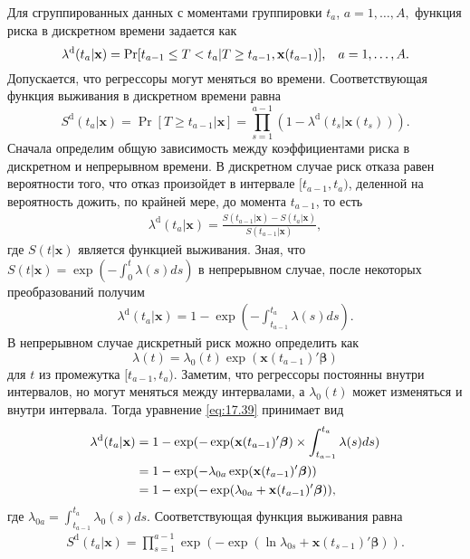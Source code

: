 \noindent
Для сгруппированных данных с моментами группировки $t_a$, $a=1, \ldots ,A,$ функция риска в дискретном времени задается как
        $$\lambda^{\mathrm{d}}(t_a|\mathbf{x})=\Pr[t_{a-1}\le T<t_a|T\ge t_{a-1},\mathbf{x}(t_{a-1})], \hspace{0.3cm} a=1, \ldots ,A.$$
Допускается, что регрессоры могут меняться во времени. Соответствующая функция выживания в дискретном времени равна
        $$S^{\mathrm{d}}(t_a|\mathbf{x})=\Pr[T\ge t_{a-1}|\mathbf{x}]=\prod^{a-1}_{s=1}\left(1-\lambda^{\mathrm{d}}(t_s|\mathbf{x}(t_s))\right).$$
Сначала определим общую зависимость между коэффициентами риска в дискретном и непрерывном времени. В дискретном случае риск отказа равен вероятности того, что отказ произойдет в интервале $[t_{a-1},t_a)$, деленной на вероятность дожить, по крайней мере, до момента $t_{a-1}$, то есть
        \begin{align}
        \label{eq:17.38}
        \lambda^{\mathrm{d}}(t_a|\mathbf{x})=\frac{S(t_{a-1}|\mathbf{x})-S(t_{a}|\mathbf{x})}{S(t_{a-1}|\mathbf{x})},
        \end{align}
где $S(t|\mathbf{x})$ является функцией выживания. Зная, что $S(t|\mathbf{x}) = \exp(-\int^{t}_{0}\lambda(s)ds)$ в непрерывном случае, после некоторых преобразований получим
        \begin{align}
        \label{eq:17.39}
        \lambda^{\mathrm{d}}(t_a|\mathbf{x})=1-\exp(-\int^{t_a}_{t_{a-1}}\lambda(s)ds).
        \end{align}
В непрерывном случае дискретный риск можно определить как
        $$\lambda(t)=\lambda_0(t)\exp(\mathbf{x}(t_{a-1})'\bm{\beta})$$
для $t$ из промежутка $[t_{a-1},t_a)$. Заметим, что регрессоры постоянны внутри интервалов, но могут меняться между интервалами, а $\lambda_0(t)$ может изменяться и внутри интервала. Тогда уравнение \ref{eq:17.39} принимает вид
        \begin{align}
        \label{eq:17.40}
        \lambda^{\mathrm{d}}(t_a|\mathbf{x})&=1-\exp(-\exp(\mathbf{x}(t_{a-1})'\bm{\beta})\times\int^{t_a}_{t_{a-1}}\lambda(s)ds)\\
        &=1-\exp(-\lambda_{0a}\exp(\mathbf{x}(t_{a-1})'\bm{\beta}))\notag\\
        &=1-\exp(-\exp(\lambda_{0a}+\mathbf{x}(t_{a-1})'\bm{\beta})),\notag
        \end{align}
где $\lambda_{0a}=\int^{t_a}_{t_{a-1}}\lambda_{0}(s)ds$. Соответствующая функция выживания равна
        \begin{align}
        \label{eq:17.41}
        S^{\mathrm{d}}(t_a|\mathbf{x})=\prod^{a-1}_{s=1}\exp\left(-\exp(\ln\lambda_{0s}+\mathbf{x}(t_{s-1})'\bm{\beta})\right).
        \end{align}


